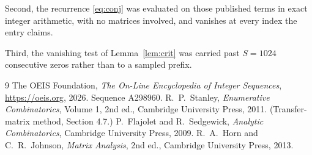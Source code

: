 \documentclass[11pt,a4paper]{article}
\theoremstyle{plain}
\theoremstyle{definition}
\begin{document}
Second, the recurrence \eqref{eq:conj} was evaluated on those published terms in exact
integer arithmetic, with no matrices involved, and vanishes at every index the entry claims.

Third, the vanishing test of Lemma~\ref{lem:crit} was carried past $S=1024$ consecutive
zeros rather than to a sampled prefix.

\begin{thebibliography}{9}
 The OEIS Foundation, \emph{The On-Line Encyclopedia of Integer
Sequences}, \url{https://oeis.org}, 2026. Sequence A298960.
 R.~P.~Stanley, \emph{Enumerative Combinatorics}, Volume 1, 2nd ed.,
Cambridge University Press, 2011. (Transfer-matrix method, Section 4.7.)
 P.~Flajolet and R.~Sedgewick, \emph{Analytic Combinatorics}, Cambridge
University Press, 2009.
 R.~A.~Horn and C.~R.~Johnson, \emph{Matrix Analysis}, 2nd ed., Cambridge
University Press, 2013.
\end{thebibliography}
\end{document}

